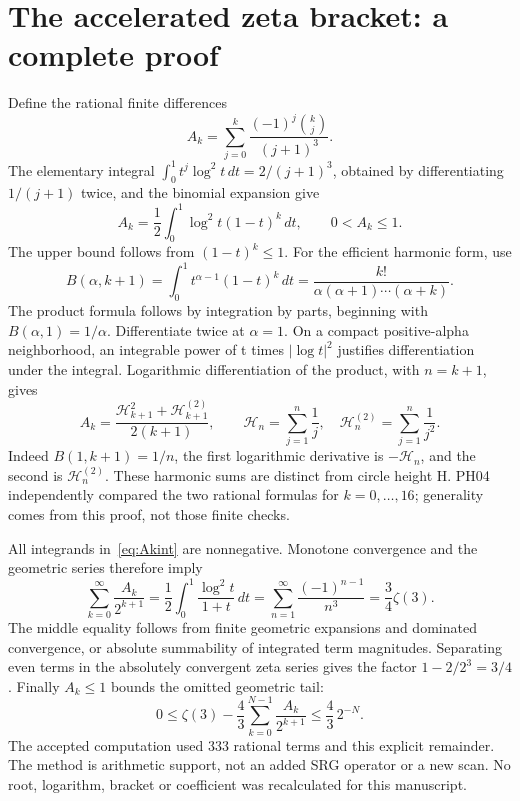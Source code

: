 \documentclass[11pt,a4paper]{article}
\begin{document}
\section{The accelerated zeta bracket: a complete proof}
\label{app:zeta}
Define the rational finite differences
\begin{equation}
A_k=\sum_{j=0}^k\frac{(-1)^j\binom kj}{(j+1)^3}.
\label{eq:Ak}
\end{equation}
The elementary integral $\int_0^1t^j\log^2t\,dt=2/(j+1)^3$, obtained by differentiating $1/(j+1)$ twice, and the binomial expansion give
\begin{equation}
A_k=\frac12\int_0^1\log^2t(1-t)^k\,dt,
\qquad 0<A_k\le1.
\label{eq:Akint}
\end{equation}
The upper bound follows from $(1-t)^k\le1$. For the efficient harmonic form, use
\[
B(\alpha,k+1)=\int_0^1t^{\alpha-1}(1-t)^k\,dt
=\frac{k!}{\alpha(\alpha+1)\cdots(\alpha+k)}.
\]
The product formula follows by integration by parts, beginning with $B(\alpha,1)=1/\alpha$. Differentiate twice at $\alpha=1$. On a compact positive-alpha neighborhood, an integrable power of t times $|\log t|^2$ justifies differentiation under the integral. Logarithmic differentiation of the product, with $n=k+1$, gives
\begin{equation}
A_k=\frac{\mathcal H_{k+1}^2+\mathcal H_{k+1}^{(2)}}{2(k+1)},\qquad
\mathcal H_n=\sum_{j=1}^n\frac1j,\quad
\mathcal H_n^{(2)}=\sum_{j=1}^n\frac1{j^2}.
\label{eq:harmonic}
\end{equation}
Indeed $B(1,k+1)=1/n$, the first logarithmic derivative is $-\mathcal H_n$, and the second is $\mathcal H_n^{(2)}$. These harmonic sums are distinct from circle height H. PH04 independently compared the two rational formulas for $k=0,\ldots,16$; generality comes from this proof, not those finite checks.

All integrands in~\eqref{eq:Akint} are nonnegative. Monotone convergence and the geometric series therefore imply
\begin{equation}
\sum_{k=0}^{\infty}\frac{A_k}{2^{k+1}}
=\frac12\int_0^1\frac{\log^2t}{1+t}\,dt
=\sum_{n=1}^{\infty}\frac{(-1)^{n-1}}{n^3}
=\frac34\zeta(3).
\label{eq:zetaseries}
\end{equation}
The middle equality follows from finite geometric expansions and dominated convergence, or absolute summability of integrated term magnitudes. Separating even terms in the absolutely convergent zeta series gives the factor $1-2/2^3=3/4$. Finally $A_k\le1$ bounds the omitted geometric tail:
\begin{equation}
0\le\zeta(3)-\frac43\sum_{k=0}^{N-1}\frac{A_k}{2^{k+1}}
\le\frac43\,2^{-N}.
\label{eq:zetatail}
\end{equation}
The accepted computation used 333 rational terms and this explicit remainder. The method is arithmetic support, not an added SRG operator or a new scan. No root, logarithm, bracket or coefficient was recalculated for this manuscript.
\end{document}
